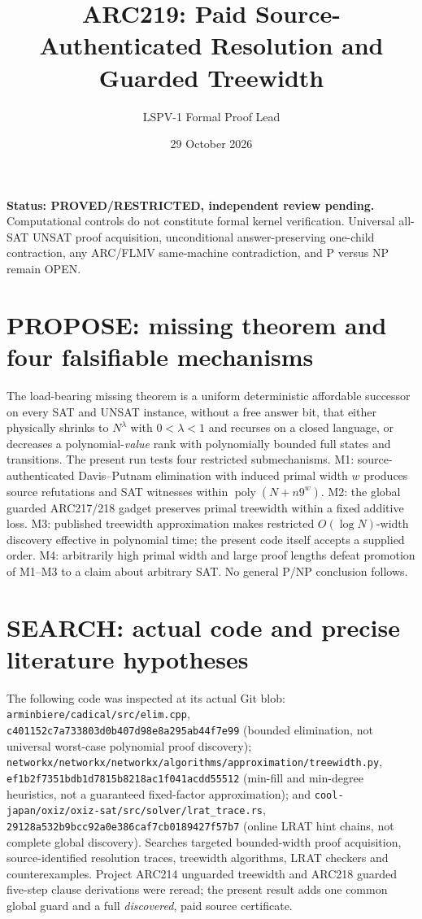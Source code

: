 \documentclass[11pt]{article}
\title{ARC219: Paid Source-Authenticated Resolution and Guarded Treewidth}
\author{LSPV-1 Formal Proof Lead}
\date{29 October 2026}
\begin{document}
\maketitle
\noindent\textbf{Status: PROVED/RESTRICTED, independent review pending.} Computational controls do not constitute formal kernel verification. Universal all-SAT UNSAT proof acquisition, unconditional answer-preserving one-child contraction, any ARC/FLMV same-machine contradiction, and P versus NP remain OPEN.

\section{PROPOSE: missing theorem and four falsifiable mechanisms}
The load-bearing missing theorem is a uniform deterministic affordable successor on every SAT and UNSAT instance, without a free answer bit, that either physically shrinks to $N^\lambda$ with $0<\lambda<1$ and recurses on a closed language, or decreases a polynomial-\emph{value} rank with polynomially bounded full states and transitions. The present run tests four restricted submechanisms. M1: source-authenticated Davis--Putnam elimination with induced primal width $w$ produces source refutations and SAT witnesses within $\operatorname{poly}(N+n9^w)$. M2: the global guarded ARC217/218 gadget preserves primal treewidth within a fixed additive loss. M3: published treewidth approximation makes restricted $O(\log N)$-width discovery effective in polynomial time; the present code itself accepts a supplied order. M4: arbitrarily high primal width and large proof lengths defeat promotion of M1--M3 to a claim about arbitrary SAT. No general P/NP conclusion follows.

\section{SEARCH: actual code and precise literature hypotheses}
The following code was inspected at its actual Git blob: \texttt{arminbiere/cadical/src/elim.cpp}, \texttt{c401152c7a733803d0b407d98e8a295ab44f7e99} (bounded elimination, not universal worst-case polynomial proof discovery); \texttt{networkx/networkx/networkx/algorithms/approximation/treewidth.py}, \texttt{ef1b2f7351bdb1d7815b8218ac1f041acdd55512} (min-fill and min-degree heuristics, not a guaranteed fixed-factor approximation); and \texttt{cool-japan/oxiz/oxiz-sat/src/solver/lrat\_trace.rs}, \texttt{29128a532b9bcc92a0e386caf7cb0189427f57b7} (online LRAT hint chains, not complete global discovery). Searches targeted bounded-width proof acquisition, source-identified resolution traces, treewidth algorithms, LRAT checkers and counterexamples. Project ARC214 unguarded treewidth and ARC218 guarded five-step clause derivations were reread; the present result adds one common global guard and a full \emph{discovered}, paid source certificate.
\end{document}
